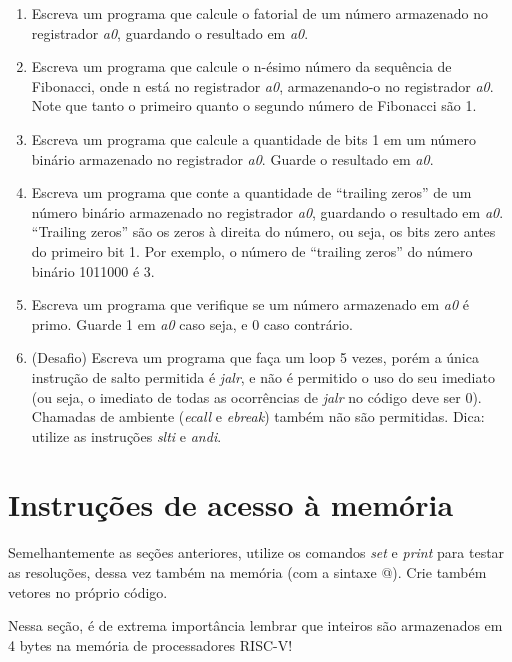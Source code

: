 \documentclass{article}
\begin{document}
\begin{enumerate}
	\item Escreva um programa que calcule o fatorial de um número armazenado no
	registrador \textit{a0}, guardando o resultado em \textit{a0}.

	\item Escreva um programa que calcule o n-ésimo número da sequência de
	Fibonacci, onde n está no registrador \textit{a0}, armazenando-o no
	registrador \textit{a0}. Note que tanto o primeiro quanto o segundo número de
	Fibonacci são 1.

	\item Escreva um programa que calcule a quantidade de bits 1 em um número
	binário armazenado no registrador \textit{a0}. Guarde o resultado em
	\textit{a0}.

	\item Escreva um programa que conte a quantidade de ``trailing zeros'' de um
	número binário armazenado no registrador \textit{a0}, guardando o resultado em
	\textit{a0}. ``Trailing zeros'' são os zeros à direita do número, ou seja, os
	bits zero antes do primeiro bit 1. Por exemplo, o número de ``trailing zeros''
	do número binário 1011000 é 3.

	\item Escreva um programa que verifique se um número armazenado em \textit{a0}
	é primo. Guarde 1 em \textit{a0} caso seja, e 0 caso contrário.

	\item (Desafio) Escreva um programa que faça um loop 5 vezes, porém a única
	instrução de salto permitida é \textit{jalr}, e não é permitido o uso do seu
	imediato (ou seja, o imediato de todas as ocorrências de \textit{jalr} no
	código deve ser 0). Chamadas de ambiente (\textit{ecall} e \textit{ebreak})
	também não são permitidas. Dica: utilize as instruções \textit{slti} e
	\textit{andi}.
\end{enumerate}

\section{Instruções de acesso à memória}

Semelhantemente as seções anteriores, utilize os comandos \textit{set} e
\textit{print} para testar as resoluções, dessa vez também na memória (com a
sintaxe @). Crie também vetores no próprio código.

Nessa seção, é de extrema importância lembrar que inteiros são armazenados em 4
bytes na memória de processadores RISC-V!
\end{document}

